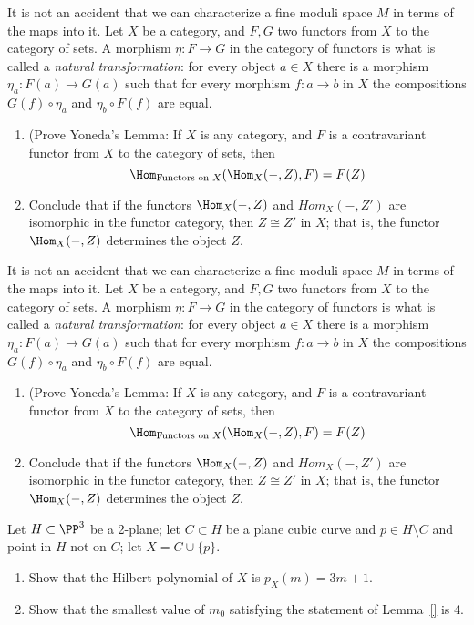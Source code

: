 \begin{exercise}
It is not an accident that we can characterize a fine moduli space $M$ in terms of the maps into it. 
 Let $X$ be a category, and $F,G$ two functors from $X$ to the category of sets.
 A morphism $\eta: F\to G$ in the category of functors is what is called a \emph{natural transformation}:
 for every object $a\in X$ there is a morphism $\eta_a:F(a) \to G(a)$ such that for every
 morphism $f: a\to b$ in $X$ the compositions $G(f)\circ \eta_a$ and $\eta_b\circ F(f)$
 are equal. 
\begin{enumerate}
 \item (Prove Yoneda's Lemma: If $X$ is any category, and $F$ is a contravariant functor from $X$ to the category of sets, then 
 $$
 \Hom_{\hbox{\scriptsize Functors on $X$}}(\Hom_X( -, Z), F) = F(Z)
 $$
 \item Conclude that if the functors $\Hom_X( -, Z)$ and $Hom_X( -, Z')$ are isomorphic in the functor category, 
 then $Z \cong Z'$ in $X$; that is, the functor $\Hom_X( -, Z)$ determines the object $Z$.
 \end{enumerate}
\end{exercise}



\begin{exercise}
It is not an accident that we can characterize a fine moduli space $M$ in terms of the maps into it. 
 Let $X$ be a category, and $F,G$ two functors from $X$ to the category of sets.
 A morphism $\eta: F\to G$ in the category of functors is what is called a \emph{natural transformation}:
 for every object $a\in X$ there is a morphism $\eta_a:F(a) \to G(a)$ such that for every
 morphism $f: a\to b$ in $X$ the compositions $G(f)\circ \eta_a$ and $\eta_b\circ F(f)$
 are equal. 
\begin{enumerate}
 \item (Prove Yoneda's Lemma: If $X$ is any category, and $F$ is a contravariant functor from $X$ to the category of sets, then 
 $$
 \Hom_{\hbox{\scriptsize Functors on $X$}}(\Hom_X( -, Z), F) = F(Z)
 $$
 \item Conclude that if the functors $\Hom_X( -, Z)$ and $Hom_X( -, Z')$ are isomorphic in the functor category, 
 then $Z \cong Z'$ in $X$; that is, the functor $\Hom_X( -, Z)$ determines the object $Z$.
 \end{enumerate}
\end{exercise}

\begin{exercise}
Let $H \subset \PP^3$ be a 2-plane; let $C \subset H$ be a plane cubic curve and $p \in H \setminus C$ and point in $H$ not on $C$; let $X = C \cup \{p\}$.
\begin{enumerate}
\item Show that the Hilbert polynomial of $X$ is $p_X(m) = 3m+1$.
\item Show that the smallest value of $m_0$ satisfying the statement of Lemma~\ref{} is 4.
\end{enumerate}
\end{exercise}



